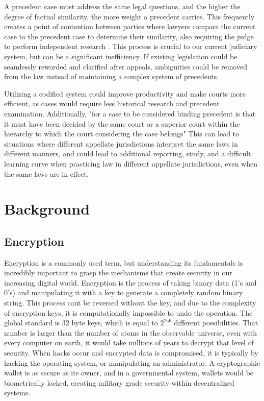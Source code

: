 \documentclass[letterpaper,twocolumn]{article}
\begin{document}
A precedent case must address the same legal questions, and the higher the degree of factual similarity, the more weight a precedent carries. This frequently creates a point of contention between parties where lawyers compare the current case to the precedent case to determine their similarity, also requiring the judge to perform independent research \cite{Precedent_Process}.  This process is crucial to our current judiciary system, but can be a significant inefficiency.  If existing legislation could be seamlessly reworded and clarified after appeals, ambiguities could be removed from the law instead of maintaining a complex system of precedents.  

Utilizing a codified system could improve productivity and make courts more efficient, as cases would require less historical research and precedent examination.  Additionally, "for a case to be considered binding precedent is that it must have been decided by the same court or a superior court within the hierarchy to which the court considering the case belongs" \cite{Precedent_Process}  This can lead to situations where different appellate jurisdictions interpret the same laws in different manners, and could lead to additional reporting, study, and a difficult learning curve when practicing law in different appellate jurisdictions, even when the same laws are in effect.

\section*{Background}

\subsection*{Encryption}
Encryption is a commonly used term, but understanding its fundamentals is incredibly important to grasp the mechanisms that create security in our increasing digital world.  Encryption is the process of taking binary data (1's and 0's) and manipulating it with a key to generate a completely random binary string.  This process cant be reversed without the key, and due to the complexity of encryption keys, it is computationally impossible to undo the operation.  The global standard is 32 byte keys, which is equal to $2^{256}$ different possibilities.  That number is larger than the number of atoms in the observable universe, even with every computer on earth, it would take millions of years to decrypt that level of security. When hacks occur and encrypted data is compromised, it is typically by hacking the operating system, or manipulating an administrator.  A cryptographic wallet is as secure as its owner, and in a governmental system, wallets would be biometrically locked, creating military grade security within decentralized systems.
\end{document}
